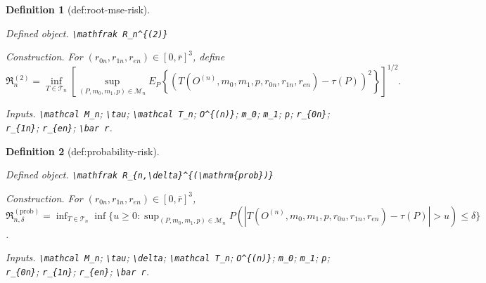 \documentclass{article}
\newtheorem{definition}{Definition}
\begin{document}
\begin{definition}[def:root-mse-risk]\label{def:root-mse-risk}
\par\smallskip\noindent\emph{Defined object.} \texttt{\textbackslash{}\allowbreak{}mathfrak R\_\allowbreak{}n\textasciicircum{}\{(2)\}\allowbreak{}}
\par\smallskip\noindent\emph{Construction.} For \((r_{0n},r_{1n},r_{en})\in[0,\bar r]^3\), define
\[
\mathfrak R_n^{(2)}
=\inf_{T\in\mathcal T_n}
\left[
\sup_{(P,m_0,m_1,p)\in\mathcal M_n}
E_P\!\left\{\left(T(O^{(n)},m_0,m_1,p,r_{0n},r_{1n},r_{en})-\tau(P)\right)^2\right\}
\right]^{1/2}.
\]
\par\smallskip\noindent\emph{Inputs.} \texttt{\textbackslash{}\allowbreak{}mathcal M\_\allowbreak{}n}; \texttt{\textbackslash{}\allowbreak{}tau}; \texttt{\textbackslash{}\allowbreak{}mathcal T\_\allowbreak{}n}; \texttt{O\textasciicircum{}\{(n)\}\allowbreak{}}; \texttt{m\_\allowbreak{}0}; \texttt{m\_\allowbreak{}1}; \texttt{p}; \texttt{r\_\allowbreak{}\{0n\}\allowbreak{}}; \texttt{r\_\allowbreak{}\{1n\}\allowbreak{}}; \texttt{r\_\allowbreak{}\{en\}\allowbreak{}}; \texttt{\textbackslash{}\allowbreak{}bar r}.
\end{definition}

\begin{definition}[def:probability-risk]\label{def:probability-risk}
\par\smallskip\noindent\emph{Defined object.} \texttt{\textbackslash{}\allowbreak{}mathfrak R\_\allowbreak{}\{n,\allowbreak{}\textbackslash{}\allowbreak{}delta\}\allowbreak{}\textasciicircum{}\{(\textbackslash{}\allowbreak{}mathrm\{prob\}\allowbreak{})\}\allowbreak{}}
\par\smallskip\noindent\emph{Construction.} For \((r_{0n},r_{1n},r_{en})\in[0,\bar r]^3\), \(\mathfrak R_{n,\delta}^{(\mathrm{prob})}=\inf_{T\in\mathcal T_n}\inf\{u\ge0:\sup_{(P,m_0,m_1,p)\in\mathcal M_n}P(|T(O^{(n)},m_0,m_1,p,r_{0n},r_{1n},r_{en})-\tau(P)|>u)\le\delta\}\).
\par\smallskip\noindent\emph{Inputs.} \texttt{\textbackslash{}\allowbreak{}mathcal M\_\allowbreak{}n}; \texttt{\textbackslash{}\allowbreak{}tau}; \texttt{\textbackslash{}\allowbreak{}delta}; \texttt{\textbackslash{}\allowbreak{}mathcal T\_\allowbreak{}n}; \texttt{O\textasciicircum{}\{(n)\}\allowbreak{}}; \texttt{m\_\allowbreak{}0}; \texttt{m\_\allowbreak{}1}; \texttt{p}; \texttt{r\_\allowbreak{}\{0n\}\allowbreak{}}; \texttt{r\_\allowbreak{}\{1n\}\allowbreak{}}; \texttt{r\_\allowbreak{}\{en\}\allowbreak{}}; \texttt{\textbackslash{}\allowbreak{}bar r}.
\end{definition}
\end{document}
